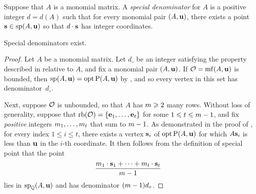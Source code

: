 \documentclass[11pt]{amsart}
\newcommand{\denom}{d} %
\begin{document}

\begin{definition}  Suppose that $A$ is a monomial matrix. A \emph{special denominator} for $A$ is a positive integer $\denom = \denom(A)$ such that for every monomial pair $(A, \mathbf{u})$, there exists a point $\mathbf{s} \in \operatorname{sp}(A, \mathbf{u})$ so that $\denom \cdot \vv{s}$ has integer coordinates.
\end{definition}

\begin{theorem}
\label{special-denominators-exist:  T}
Special denominators exist.
\end{theorem}

\begin{proof}
   Let $A$ be a monomial matrix.
   Let $\denom_{\circ}$ be an integer satisfying the property described in  relative to $A$, and fix a monomial pair $(A, \mathbf{u})$.
   If $\mathcal{O} = \operatorname{mf}(A, \mathbf{u})$ is bounded, then $\operatorname{sp}(A, \mathbf{u}) = \operatorname{opt} \mathrm{P}(A, \mathbf{u})$ by , and so every vertex in this set has denominator~$\denom_{\circ}$.

   Next, suppose $\mathcal{O}$ is unbounded, so that $A$ has $m \geqslant 2$ many rows.
   Without loss of generality, suppose that $\operatorname{rb}(\mathcal{O}) = \{ \mathbf{e}_1, \ldots, \mathbf{e}_t \}$ for some $1 \leqslant t \leqslant m-1$, and fix \emph{positive} integers $m_1, \ldots, m_t$ that sum to $m-1$.
   As demonstrated in the  proof of , for every index  $1 \leq i \leq t$, there exists a vertex $\mathbf{s}_i$ of $\operatorname{opt} \mathrm{P}(A, \mathbf{u})$ for which $A \mathbf{s}_i$ is less than $\mathbf{u}$ in the $i$-th coordinate.
   It then follows from the definition of special point that the point
   \[ \frac{ m_1 \cdot \mathbf{s}_1 + \cdots + m_t \cdot  \mathbf{s}_t}{m-1}  \]
   lies in $\operatorname{sp}_{\mathbb{Q}}(A, \mathbf{u})$ and has denominator $(\numvars-1)\denom_{\circ}$.
\end{proof}
\end{document}
